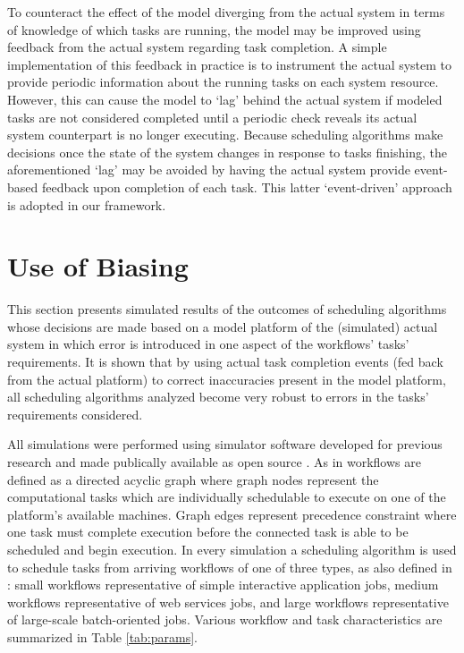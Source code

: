 \documentclass[10pt]{csce}
\begin{document}
To counteract the effect of the model diverging from the actual system in
terms of knowledge of which tasks are running, the model may be improved
using feedback from the actual system regarding task completion.  A simple
implementation of this feedback in practice is to instrument the actual system
to provide periodic information about the running tasks on each system
resource.  However, this can cause the model to `lag' behind the actual system
if modeled tasks are not considered completed until a periodic check reveals
its actual system counterpart is no longer executing.  Because scheduling
algorithms make decisions once the state of the system changes in response to
tasks finishing, the aforementioned `lag' may be avoided by having the actual
system provide event-based feedback upon completion of each task.  This latter
`event-driven' approach is adopted in our framework.


\section{Use of Biasing}
\label{sec:Biasing}

This section presents simulated results of the outcomes of scheduling algorithms
whose decisions are made based on a model platform of the (simulated) actual
system in which error is introduced in one aspect of the workflows' tasks'
requirements.  It is shown that by using actual task completion events (fed back
from the actual platform) to correct inaccuracies present in the model
platform, all scheduling algorithms analyzed become very robust to errors in the
tasks' requirements considered.

All simulations were performed using simulator software developed for
previous research \cite{costmin} and made publically available as open source
\cite{soasim}.  As in \cite{costmin} workflows are defined as a directed
acyclic graph where graph nodes represent the computational tasks which are
individually schedulable to execute on one of the platform's available machines.
Graph edges represent precedence constraint where one task must complete
execution before the connected task is able to be scheduled and begin
execution.  In every simulation a scheduling algorithm
is used to schedule tasks from arriving workflows of one of three types, as
also defined in \cite{costmin}: small workflows representative of simple
interactive application jobs, medium workflows representative of web services
jobs, and large workflows representative of large-scale batch-oriented jobs.
Various workflow and task characteristics are summarized in Table
\ref{tab:params}.
\end{document}
